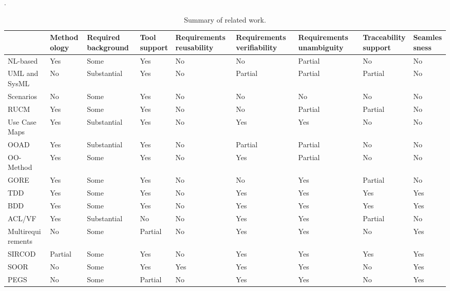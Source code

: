 \begingroup
\setlength\tabcolsep{0.08cm}.

\begin{table*}
\small 
\centering
    \begin{tabular}[M]{|p{2.5cm} | p{1.7cm}| p{1.5cm}| p{1.0cm}| p{1.7cm}| p{1.7cm} |p{1.7cm}| p{1.5cm}| p{1.7cm}|}
    \hline
& Methodology & Required \newline background & Tool \newline support & Requirements reusability & Requirements  \newline verifiability & Requirements \newline unambiguity & Traceability \newline support & Seamlessness \\
\hline
NL-based & Yes & Some & Yes & No & No & Partial&No&No \\
UML and SysML & No & Substantial & Yes & No & Partial & Partial & Partial & No \\
Scenarios & No & Some & Yes & No & No & No & No & No \\
RUCM & Yes & Some & Yes & No & No & Partial & Partial & No \\
Use Case Maps & Yes & Substantial & Yes & No & Yes & Yes & No & No \\
OOAD & Yes & Substantial & Yes & No & Partial & Partial & No & No \\
OO-Method & Yes & Some & Yes & No & Yes & Partial & No & No \\
GORE & Yes & Some & Yes & No & No & Yes & Partial & No \\
TDD & Yes & Some & Yes & No & Yes & Yes & Yes & Yes \\ 
BDD & Yes & Some & Yes & No & Yes & Yes & Yes & Yes \\
ACL/VF & Yes & Substantial & No & No & Yes & Yes & Partial & No \\
Multirequirements & No & Some & Partial & No & Yes & Yes & No & Yes \\
SIRCOD & Partial & Some & Yes & No & Yes & Yes & Yes & Yes \\
SOOR & No & Some & Yes & Yes & Yes & Yes & No & Yes \\
PEGS & No & Some & Partial & No & Yes & Yes & No & Yes \\
\hline
    \end{tabular}
    \caption{Summary of related work.}
    \label{tab:related_work}
\end{table*}
\endgroup
